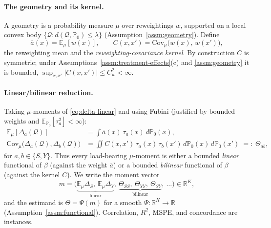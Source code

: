 \paragraph{The geometry and its kernel.}
A geometry is a probability measure $\mu$ over reweightings $w$, supported on a local
convex body $\{\mathcal{Q}:d(\mathcal{Q},\mathbb{P}_0)\le\lambda\}$ (Assumption~\ref{assm:geometry}).
Define
\begin{equation}
\bar{a}(x) = \mathbb{E}_\mu[w(x)],
\qquad
C(x,x') = \mathrm{Cov}_\mu\!\big(w(x),\,w(x')\big),
\label{eq:kernel-def}
\end{equation}
the reweighting mean and the \emph{reweighting-covariance kernel}. By construction $C$ is
symmetric; under Assumptions~\ref{assm:treatment-effects}(c) and \ref{assm:geometry} it is
bounded, $\sup_{x,x'}|C(x,x')|\le C_w^2<\infty$.

\paragraph{Linear/bilinear reduction.}
Taking $\mu$-moments of \eqref{eq:delta-linear} and using Fubini (justified by bounded weights
and $\mathbb{E}_{\mathbb{P}_0}[\tau_a^2]<\infty$):
\begin{align}
\mathbb{E}_\mu[\Delta_a(\mathcal{Q})]
   &= \int \bar{a}(x)\,\tau_a(x)\,d\mathbb{P}_0(x),
   \tag{linear}\label{eq:reduction-linear}\\
\mathrm{Cov}_\mu\!\big(\Delta_a(\mathcal{Q}),\Delta_b(\mathcal{Q})\big)
   &= \iint C(x,x')\,\tau_a(x)\,\tau_b(x')\,d\mathbb{P}_0(x)\,d\mathbb{P}_0(x')
   \;=:\; \Theta_{ab},
   \tag{bilinear}\label{eq:reduction-bilinear}
\end{align}
for $a,b\in\{S,Y\}$. Thus every load-bearing $\mu$-moment is either a bounded \emph{linear}
functional of $\beta$ (against the weight $\bar{a}$) or a bounded \emph{bilinear} functional
of $\beta$ (against the kernel $C$). We write the moment vector
\begin{equation}
m = \big(\underbrace{\mathbb{E}_\mu\Delta_S,\ \mathbb{E}_\mu\Delta_Y}_{\text{linear}},\ 
        \underbrace{\Theta_{SS},\ \Theta_{YY},\ \Theta_{SY}}_{\text{bilinear}},\ \dots\big)
        \in\mathbb{R}^K,
\end{equation}
and the estimand is $\Theta = \Psi(m)$ for a smooth $\Psi:\mathbb{R}^K\to\mathbb{R}$
(Assumption~\ref{assm:functional}). Correlation, $R^2$, MSPE, and concordance are instances.

